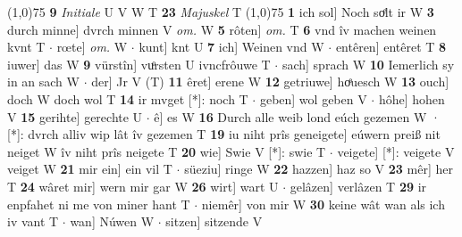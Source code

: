 \documentclass[8pt,a4paper,notitlepage]{article}
\begin{document}
\begin{table}[ht]
\begin{minipage}[t]{0.5\linewidth}
\line(1,0){75} \newline
\textbf{9} \textit{Initiale} U V W T  \textbf{23} \textit{Majuskel} T  \newline
\line(1,0){75} \newline
\textbf{1} ich sol] Noch soͤlt ir W \textbf{3} durch minne] dvrch minnen V \textit{om.} W \textbf{5} rôten] \textit{om.} T \textbf{6} vnd îv machen weinen kvnt T  $\cdot$ rœte] \textit{om.} W  $\cdot$ kunt] knt U \textbf{7} ich] Weinen vnd W  $\cdot$ entêren] entêret T \textbf{8} iuwer] das W \textbf{9} vürstîn] vuͦrsten U ivncfrôuwe T  $\cdot$ sach] sprach W \textbf{10} Iemerlich sy in an sach W  $\cdot$ der] Jr V (T) \textbf{11} êret] erene W \textbf{12} getriuwe] hoͤuesch W \textbf{13} ouch] doch W doch wol T \textbf{14} ir mvget [*]: noch T  $\cdot$ geben] wol geben V  $\cdot$ hôhe] hohen V \textbf{15} gerihte] gerechte U  $\cdot$ ê] es W \textbf{16} Durch alle weib lond eúch gezemen W · [*]: dvrch alliv wip lât îv gezemen T \textbf{19} iu niht prîs geneigete] eúwern preiß nit neiget W îv niht prîs neigete T \textbf{20} wie] Swie V [*]: swie T  $\cdot$ veigete] [*]: veigete V veiget W \textbf{21} mir ein] ein vil T  $\cdot$ süeziu] ringe W \textbf{22} hazzen] haz so V \textbf{23} mêr] her T \textbf{24} wâret mir] wern mir gar W \textbf{26} wirt] wart U  $\cdot$ gelâzen] verlâzen T \textbf{29} ir enpfahet ni me von miner hant T  $\cdot$ niemêr] von mir W \textbf{30} keine wât wan als ich iv vant T  $\cdot$ wan] Núwen W  $\cdot$ sitzen] sitzende V \newline
\end{minipage}
\end{table}
\end{document}

